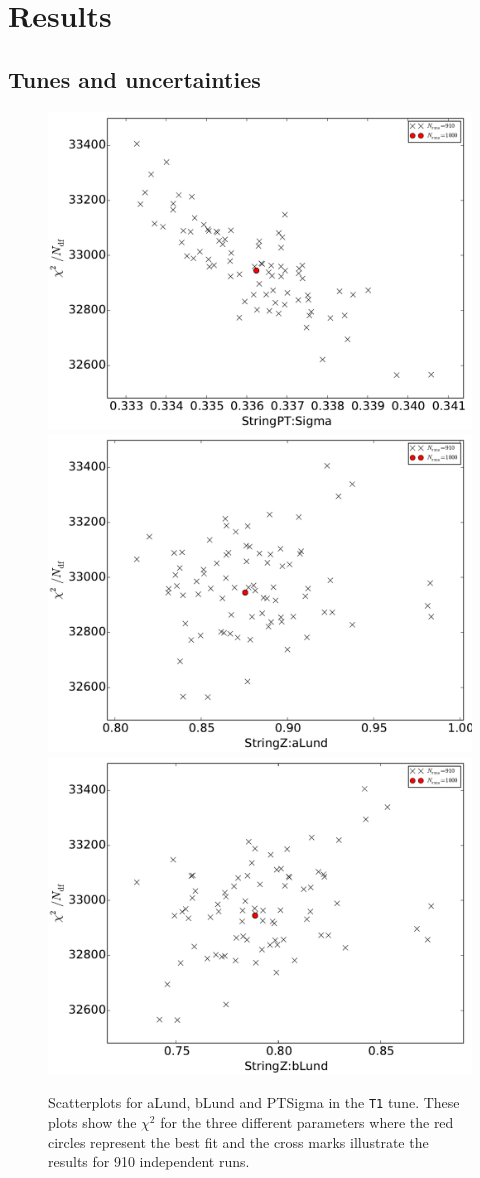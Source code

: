 \documentclass[aps,preprint,floatfix,nofootinbib,showpacs]{revtex4-1}
\begin{document}
\section{Results}
\label{Section4}

\subsection{Tunes and uncertainties}
\begin{figure}[!h]
 \centering
 \includegraphics[width=0.47\linewidth]{Figures/RS/Set1/chi2_StringPT_Sigma.pdf}
 \hfill
 \includegraphics[width=0.47\linewidth]{Figures/RS/Set1/chi2_StringZ_aLund.pdf}
 \hfill
 \includegraphics[width=0.47\linewidth]{Figures/RS/Set1/chi2_StringZ_bLund.pdf}
 \caption{Scatterplots for \textsf{aLund}, \textsf{bLund} and \textsf{PTSigma} in
 the \texttt{T1} tune. These plots show the $\chi^2$ for the three different 
 parameters where the red circles represent the best fit and the cross marks illustrate 
 the results for 910 independent runs.}
 \label{RS.1}
\end{figure}
\end{document}
